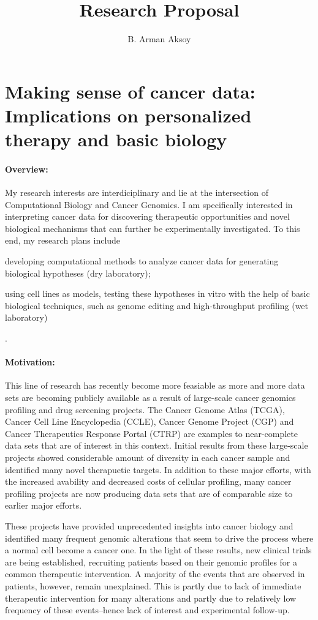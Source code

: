 \documentclass[11pt,letterpaper]{article}
\title{Research Proposal}
\author{B. Arman Aksoy}
\date{}
\begin{document}
\maketitle

\section*{Making sense of cancer data: Implications on personalized therapy and basic biology}
\paragraph{Overview:} My research interests are interdiciplinary and lie at the intersection of Computational Biology and Cancer Genomics.
I am specifically interested in interpreting cancer data for discovering therapeutic opportunities and novel biological mechanisms that can further be experimentally investigated.
To this end, my research plans include
\begin{inparaenum}[(i)]
 \item developing computational methods to analyze cancer data for generating biological hypotheses (dry laboratory);
 \item using cell lines as models, testing these hypotheses in vitro with the help of basic biological techniques, such as genome editing and high-throughput profiling (wet laboratory)
\end{inparaenum}.

\paragraph{Motivation:} This line of research has recently become more feasiable as more and more data sets are becoming publicly available as a result of large-scale cancer genomics profiling and drug screening projects. 
The Cancer Genome Atlas (TCGA), Cancer Cell Line Encyclopedia (CCLE), Cancer Genome Project (CGP) and Cancer Therapeutics Response Portal (CTRP) are examples to near-complete data sets that are of interest in this context.
Initial results from these large-scale projects showed considerable amount of diversity in each cancer sample
and identified many novel therapuetic targets.
In addition to these major efforts, with the increased avability and decreased costs of cellular profiling, many cancer profiling projects are now producing data sets that are of comparable size to earlier major efforts.

These projects have provided unprecedented insights into cancer biology
and identified many frequent genomic alterations that seem to drive the process where a normal cell become a cancer one.
In the light of these results, new clinical trials are being established, recruiting patients based on their genomic profiles for a common therapeutic intervention.
A majority of the events that are observed in patients, however, remain unexplained.
This is partly due to lack of immediate therapeutic intervention for many alterations
and partly due to relatively low frequency of these events--hence lack of interest and experimental follow-up.
\end{document}
